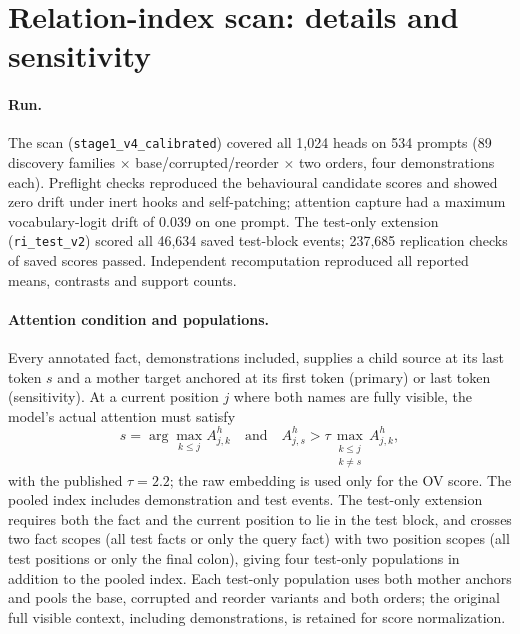 \section{Relation-index scan: details and sensitivity}
\label{app:stage1}

\paragraph{Run.}
The scan (\texttt{stage1\_v4\_calibrated}) covered all 1,024 heads on 534 prompts
(89 discovery families $\times$ base/corrupted/reorder $\times$ two orders, four
demonstrations each). Preflight checks reproduced the behavioural candidate scores
and showed zero drift under inert hooks and self-patching; attention capture had a
maximum vocabulary-logit drift of 0.039 on one prompt. The test-only extension
(\texttt{ri\_test\_v2}) scored all 46,634 saved test-block events; 237,685
replication checks of saved scores passed. Independent recomputation reproduced all
reported means, contrasts and support counts.

\paragraph{Attention condition and populations.}
Every annotated fact, demonstrations included, supplies a child source at its last
token $s$ and a mother target anchored at its first token (primary) or last token
(sensitivity). At a current position $j$ where both names are fully visible, the
model's actual attention must satisfy
\begin{equation}
\label{eq:qkgate}
s=\arg\max_{k\le j}A^h_{j,k}
\quad\text{and}\quad
A^h_{j,s}>\tau\max_{\substack{k\le j\\k\ne s}}A^h_{j,k},
\end{equation}
with the published $\tau=2.2$; the raw embedding is used only for the OV score.
The pooled index includes demonstration and test events. The test-only extension
requires both the fact and the current position to lie in the test block, and
crosses two fact scopes (all test facts or only the query fact) with two position
scopes (all test positions or only the final colon), giving four test-only
populations in addition to the pooled index. Each test-only population uses both
mother anchors and pools the base, corrupted and reorder variants and both orders;
the original full visible context, including demonstrations, is retained for score
normalization.

